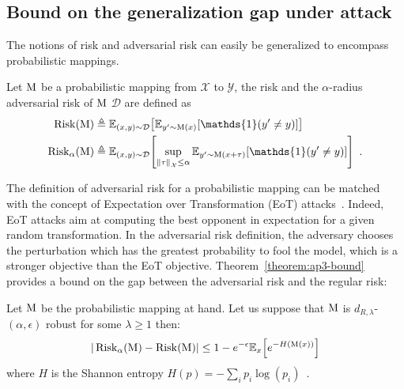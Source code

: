 \subsection{Bound on the generalization gap under attack}

The notions of risk and adversarial risk can easily be generalized to encompass probabilistic mappings.
\begin{definition}
  Let $\operatorname*{M}$ be a probabilistic mapping from $\mathcal{X}$ to $\mathcal{Y}$, the risk and the $\alpha$-radius adversarial risk of $\operatorname*{M}$ \wrt $\mathcal{D}$ are defined as 
  \begin{align}
    \Risk(\probmap) &\triangleq \mathbb{E}_{(x,y) \sim \mathcal{D}} \left[ \mathbb{E}_{y'\sim \probmap(x)} \left[ \mathds{1} \left( y' \neq y \right)\right]\right] \\
    \advRisk(\probmap) &\triangleq \mathbb{E}_{(x,y)\sim \mathcal{D}}\left[ \sup_{\norm{\tau}_{\mathcal{X}} \leq \alpha}\mathbb{E}_{y'\sim \probmap(x+\tau)} \left[ \mathds{1} \left( y' \neq y \right)\right]\right]\enspace.
  \end{align}
  \removespace
\end{definition}

\noindent
The definition of adversarial risk for a probabilistic mapping can be matched with the concept of Expectation over Transformation (EoT) attacks~\cite{athalye2018obfuscated}.
Indeed, EoT attacks aim at computing the best opponent in expectation for a given random transformation.
In the adversarial risk definition, the adversary chooses the perturbation which has the greatest probability to fool the model, which is a stronger objective than the EoT objective.
Theorem~\ref{theorem:ap3-bound} provides a bound on the gap between the adversarial risk and the regular risk:
\begin{theorem}
  Let $\operatorname*{M}$ be the probabilistic mapping at hand.
  Let us suppose that  $\operatorname*{M}$ is $d_{R,\lambda}$-$(\alpha,\epsilon)$ robust for some $\lambda\geq1$ then:
  \begin{equation}
    |\advRisk(\probmap)-\Risk(\probmap)|\leq 1-e^{-\epsilon}\mathbb{E}_x\left[e^{-H(\probmap(x))}\right]
  \end{equation}
  where $H$ is the Shannon entropy $H(p)=-\sum_i p_i \log(p_i)\enspace.$
\label{theorem:ap3-bound}
\end{theorem}

